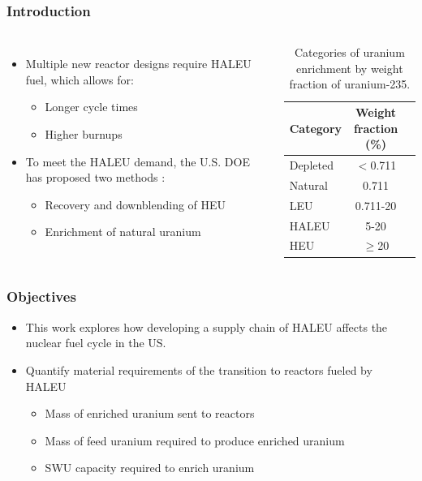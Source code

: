 \begin{frame}
    \frametitle{Introduction}
    \begin{columns}
        \column[t]{5cm}
    \begin{itemize}
    \item Multiple new reactor designs require \gls{HALEU} fuel, which allows for: 
    \begin{itemize}
        \item Longer cycle times
        \item Higher burnups 
    \end{itemize}
    \item<1-> To meet the \gls{HALEU} demand, the U.S. \gls{DOE} has proposed two methods \cite{griffith_overview_2020}:
    \begin{itemize}
        \item Recovery and downblending of \gls{HEU}
        \item Enrichment of natural uranium
    \end{itemize}
    \end{itemize}

    \column[t]{5cm}
    \begin{table}
        \centering
        \caption{Categories of uranium enrichment by weight fraction of 
        uranium-235.}
        \label{tab:enrichemnt}
        \begin{tabular}{l c c}
            \hline
            Category & Weight fraction (\%)\\\hline
            Depleted & $<$0.711 \\
            Natural & 0.711 \\
            LEU & 0.711-20 \\
            \gls{HALEU} & 5-20 \\
            \gls{HEU} & $\ge$20 \\
            \hline
        \end{tabular}
    \end{table}
    \end{columns}
\end{frame}

\begin{frame}
    \frametitle{Objectives}
    \begin{itemize}
    \item This work explores how developing a supply chain of \gls{HALEU} affects 
    the nuclear fuel cycle in the US. 
    \item Quantify material requirements of the transition to reactors 
              fueled by \gls{HALEU}
    \begin{itemize}
        \item<-1> Mass of enriched uranium sent to reactors
        \item<-1> Mass of feed uranium required to produce enriched uranium
        \item<-1> \gls{SWU} capacity required to enrich uranium 
    \end{itemize}
\end{itemize}
\end{frame}